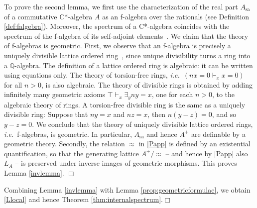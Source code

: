 \documentclass[12pt]{article}
\newcommand{\Q}{\mathbb{Q}}
\newcommand{\er}{\eqref}
\newcommand{\sa}{\ensuremath{_{\mathrm{sa}}}}
\newcommand{\ie}{\textit{i.e.}}
\newcommand{\qed}{\nobreak\hfill$\Box$}
\begin{document}
 To prove the second lemma, we first use the  characterization of
the real part $A\sa$ of a commutative C*-algebra $A$ as an f-algebra over the rationals
(see Definition \ref{def:falgebra}). Moreover, the spectrum of a C*-algebra coincides with the spectrum of the f-algebra of
its self-adjoint elements~\cite{CoquandSpitters:cstar}.
We claim that the theory of
f-algebras is geometric. First, we observe that an f-algebra is precisely a
uniquely
divisible lattice ordered ring~\cite[p151]{coquand05},
since unique divisibility turns a ring into a $\Q$-algebra. The definition of
a lattice ordered ring is algebraic: it can be written using equations only.
The theory of torsion-free rings,
\ie\  $(nx=0\vdash_x x=0)$ for all $n>0$, is also algebraic.
The theory of divisible rings is obtained by adding infinitely many
geometric axioms $\top \vdash_x \exists_{y} n y=x$, one
for each $n>0$, to the algebraic theory of rings. A torsion-free divisible ring
is the same as a uniquely divisible ring: 
Suppose that $ny=x$ and $nz=x$, then $n(y-z)=0$, and so
$y-z=0$. We conclude that the theory of uniquely divisible lattice
ordered rings, \ie\ f-algebras, is geometric. In particular, $A\sa$ and hence $A^+$ are 
definable by a geometric theory. Secondly, the  relation $\approx$ in \er{Papp} is defined by an existential quantification, so that 
the generating lattice $A^+/\approx$ -- and hence by \er{Papp} also $L_A$ --
 is
preserved under inverse images of geometric morphisms.  This proves Lemma \ref{invlemma}.
\qed

Combining Lemma \ref{invlemma} with  Lemma \ref{prop:geometricformulae}, 
we obtain \er{Llocal} and hence Theorem \ref{thm:internalspectrum}.\qed

\medskip
\end{document}
